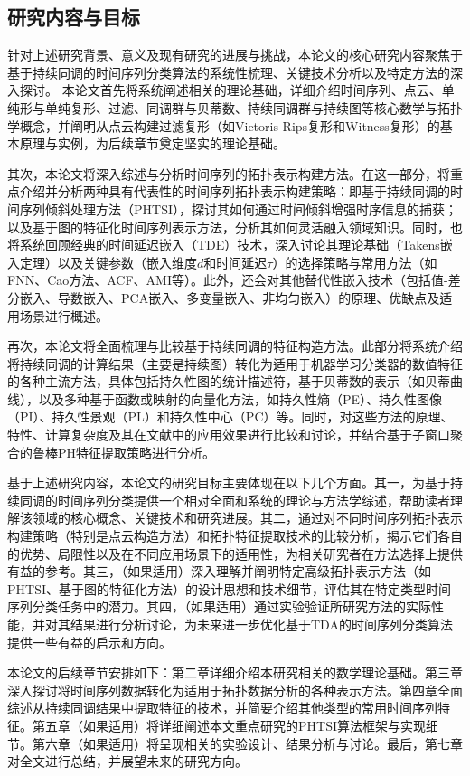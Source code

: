 \subsection{研究内容与目标}
针对上述研究背景、意义及现有研究的进展与挑战，本论文的核心研究内容聚焦于基于持续同调的时间序列分类算法的系统性梳理、关键技术分析以及特定方法的深入探讨。
本论文首先将系统阐述相关的理论基础，详细介绍时间序列、点云、单纯形与单纯复形、过滤、同调群与贝蒂数、持续同调群与持续图等核心数学与拓扑学概念，并阐明从点云构建过滤复形（如Vietoris-Rips复形和Witness复形）的基本原理与实例，为后续章节奠定坚实的理论基础。

其次，本论文将深入综述与分析时间序列的拓扑表示构建方法。在这一部分，将重点介绍并分析两种具有代表性的时间序列拓扑表示构建策略：即基于持续同调的时间序列倾斜处理方法（PHTSI）\cite{JSJC202406009}，探讨其如何通过时间倾斜增强时序信息的捕获；以及基于图的特征化时间序列表示方法\cite{2}，分析其如何灵活融入领域知识。同时，也将系统回顾经典的时间延迟嵌入（TDE）技术，深入讨论其理论基础（Takens嵌入定理）以及关键参数（嵌入维度$d$和时间延迟$\tau$）的选择策略与常用方法（如FNN、Cao方法、ACF、AMI等）。此外，还会对其他替代性嵌入技术（包括值-差分嵌入、导数嵌入、PCA嵌入、多变量嵌入、非均匀嵌入）的原理、优缺点及适用场景进行概述。

再次，本论文将全面梳理与比较基于持续同调的特征构造方法。此部分将系统介绍将持续同调的计算结果（主要是持续图）转化为适用于机器学习分类器的数值特征的各种主流方法，具体包括持久性图的统计描述符，基于贝蒂数的表示（如贝蒂曲线），以及多种基于函数或映射的向量化方法，如持久性熵（PE）、持久性图像（PI）、持久性景观（PL）和持久性中心（PC）等。同时，对这些方法的原理、特性、计算复杂度及其在文献中的应用效果进行比较和讨论，并结合基于子窗口聚合的鲁棒PH特征提取策略\cite{3}进行分析。


基于上述研究内容，本论文的研究目标主要体现在以下几个方面。其一，为基于持续同调的时间序列分类提供一个相对全面和系统的理论与方法学综述，帮助读者理解该领域的核心概念、关键技术和研究进展。其二，通过对不同时间序列拓扑表示构建策略（特别是点云构造方法）和拓扑特征提取技术的比较分析，揭示它们各自的优势、局限性以及在不同应用场景下的适用性，为相关研究者在方法选择上提供有益的参考。其三，（如果适用）深入理解并阐明特定高级拓扑表示方法（如PHTSI、基于图的特征化方法）的设计思想和技术细节，评估其在特定类型时间序列分类任务中的潜力。其四，（如果适用）通过实验验证所研究方法的实际性能，并对其结果进行分析讨论，为未来进一步优化基于TDA的时间序列分类算法提供一些有益的启示和方向。

本论文的后续章节安排如下：第二章详细介绍本研究相关的数学理论基础。第三章深入探讨将时间序列数据转化为适用于拓扑数据分析的各种表示方法。第四章全面综述从持续同调结果中提取特征的技术，并简要介绍其他类型的常用时间序列特征。第五章（如果适用）将详细阐述本文重点研究的PHTSI算法框架与实现细节。第六章（如果适用）将呈现相关的实验设计、结果分析与讨论。最后，第七章对全文进行总结，并展望未来的研究方向。



